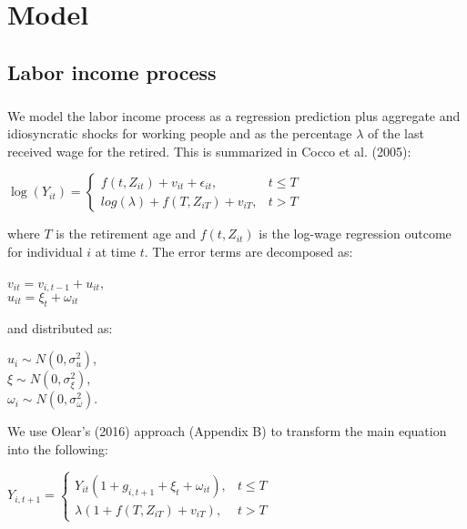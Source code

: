 \chapter{Model}
\label{model}

\section{Labor income process}

\paragraph*{}We model the labor income process as a regression prediction plus aggregate and idiosyncratic shocks for working people and as the percentage $\lambda$ of the last received wage for the retired. This is summarized in Cocco et al. (2005):

\begin{center}
	$\log(Y_{it}) =
		\begin{cases}
			f(t,Z_{it}) + v_{it} + \epsilon_{it}, & t \leq T \\
			log(\lambda) + f(T, Z_{iT}) + v_{iT}, & t > T
		\end{cases}
	$
\end{center}

where $T$ is the retirement age and $f(t, Z_{it})$ is the log-wage regression outcome for individual $i$ at time $t$. The error terms are decomposed as:

\begin{center}
	$v_{it} = v_{i,t-1} + u_{it}$,\\
	$u_{it} = \xi_t + \omega_{it}$
\end{center}

and distributed as:

\begin{center}
	$u_{i} \sim N(0, \sigma^2_u)$,\\
	$\xi \sim N(0,\sigma^2_{\xi})$,\\
	$\omega_{i} \sim N(0, \sigma^2_{\omega})$.
\end{center}

We use Olear's (2016) approach (Appendix B) to transform the main equation into the following:

\begin{center}
	$Y_{i,t+1} = 
	\begin{cases}
		Y_{it} (1 + g_{i,t+1} + \xi_t + \omega_{it}), & t \leq T \\
		\lambda (1 + f(T, Z_{iT}) + v_{iT}), & t > T
	\end{cases}	
	$
\end{center}

